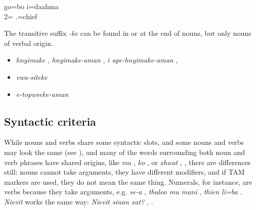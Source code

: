 
%
%
%
%
%

\ea\label{ex:predN}
\gll go=bo i=daahma\\
 2= .=chief\\
\glt {}
\z


The transitive suffix \textit{-ke} can be found in or at the end of nouns, but only nouns of verbal origin. 
\begin{itemize}
	\item \textit{hnyimake} , \textit{hnyimake-aman} , \textit{i ape-hnyimake-aman} , 
	\item \textit{vwa-siteke} 
	\item \textit{e-topweeke-aman} 
\end{itemize}

\subsection{Syntactic criteria}

While nouns and verbs share some syntactic slots, and some nouns and verbs may look the same (see ), and many of the words surrounding both noun and verb phrases have shared origins, like \textit{ma} , \textit{ko} , or \textit{xhwat} , , there are differences still: nouns cannot take arguments, they have different modifiers, and if TAM markers are used, they do not mean the same thing.
Numerals, for instance, are verbs because they take arguments, e.g. \textit{se-a} , \textit{thaloo mu mani} , \textit{thien li=ba} . \textit{Nievit}  works the same way: \textit{Nievit sinan xat?} , .%

